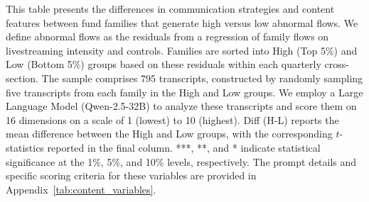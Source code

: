 \begin{table}[!ht]
    \centering
    
    \caption{Differences in livestream communication styles: High vs. Low residual flow families}\label{tab:t_test}
    
    \begin{minipage}{0.95\textwidth}
    \footnotesize
     This table presents the differences in communication strategies and content features between fund families that generate high versus low abnormal flows. We define abnormal flows as the residuals from a regression of family flows on livestreaming intensity and controls. Families are sorted into High (Top 5\%) and Low (Bottom 5\%) groups based on these residuals within each quarterly cross-section. The sample comprises 795 transcripts, constructed by randomly sampling five transcripts from each family in the High and Low groups. We employ a Large Language Model (Qwen-2.5-32B) to analyze these transcripts and score them on 16 dimensions on a scale of 1 (lowest) to 10 (highest). Diff (H-L) reports the mean difference between the High and Low groups, with the corresponding $t$-statistics reported in the final column. ***, **, and * indicate statistical significance at the 1\%, 5\%, and 10\% levels, respectively. The prompt details and specific scoring criteria for these variables are provided in Appendix~\ref{tab:content_variables}. %
    \end{minipage}

    \vspace{2mm}


\end{table}
